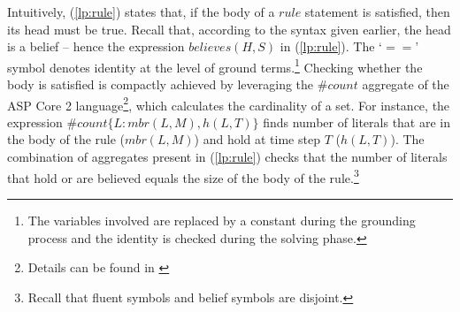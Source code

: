 \documentclass{article}
\begin{document}
%
Intuitively, (\ref{lp:rule}) states that, if the body of a $rule$ statement is satisfied, then its head must be true. Recall that, according to the syntax given earlier, the head is a belief -- hence the expression $believes(H,S)$ in (\ref{lp:rule}). The `$==$' symbol denotes identity at the level of ground terms.\footnote{The variables involved are replaced by a constant during the grounding process and the identity is checked during the solving phase.} Checking whether the body is satisfied is compactly achieved by leveraging the $\#count$ aggregate of the ASP Core 2 language\footnote{Details can be found in \cite{ASPCore2Standard}}, which calculates the cardinality of a set. For instance, the expression $\# count \{L : mbr(L, M), h(L, T) \}$ finds number of literals that are in the body of the rule ($mbr(L,M)$) and hold at time step $T$ ($h(L,T)$). The combination of aggregates present in (\ref{lp:rule}) checks that the number of literals that hold or are believed equals the size of the body of the rule.\footnote{Recall that fluent symbols and belief symbols are disjoint. }
\end{document}
